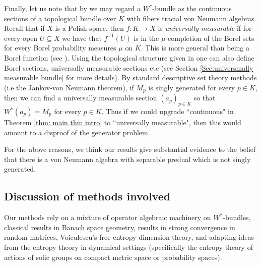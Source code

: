 \documentclass[10pt]{amsart}
\theoremstyle{definition}
\numberwithin{equation}{section}
\newcommand{\bN}{{\mathbb N}}
\begin{document}
Finally, let us note that by \cite{EPBundles} we may regard a $W^{*}$-bundle as the continuous sections of a topological bundle over $K$ with fibers tracial von Neumann algebras. Recall that if $X$ is a Polish space, then $f\colon K\to X$ is \emph{universally measurable} if for every open $U\subseteq X$ we have that $f^{-1}(U)$ is in the $\mu$-completion of the Borel sets for every Borel probability measures $\mu$ on $K$. This is more general than being a Borel function (see \cite[Theorems 14.2 and 21.10]{KechrisClassic}).
Using the topological structure given in \cite{EPBundles} one can also define Borel sections, universally measurable sections etc (see Section \ref{Sec:universmally measurable bundle} for more details). By standard descriptive set theory methods (i.e the Jankov-von Neumann theorem), if $M_{p}$ is singly generated for every $p\in K$, then we can find a universally measurable section $(a_{p})_{p\in K}$ so that $W^{*}(a_{p})=M_{p}$ for every $p\in K$. Thus if we could upgrade ``continuous" in Theorem \ref{thm: main thm intro} to ``universally measurable", then this would amount to a disproof of the generator problem. 


 
For the above reasons, we think our results give substantial evidence to the belief that there is a von Neumann algebra with separable predual which is not singly generated.
\subsection*{Discussion of methods involved}
Our methods rely on a mixture of operator algebraic machinery on $W^{*}$-bundles, classical results in Banach space geometry, results in strong convergence in random matrices, Voiculescu's free entropy dimension theory, and adapting ideas from the entropy theory in dynamical settings (specifically the entropy theory of actions of sofic groups on compact metric space or probability spaces). 
\end{document}
